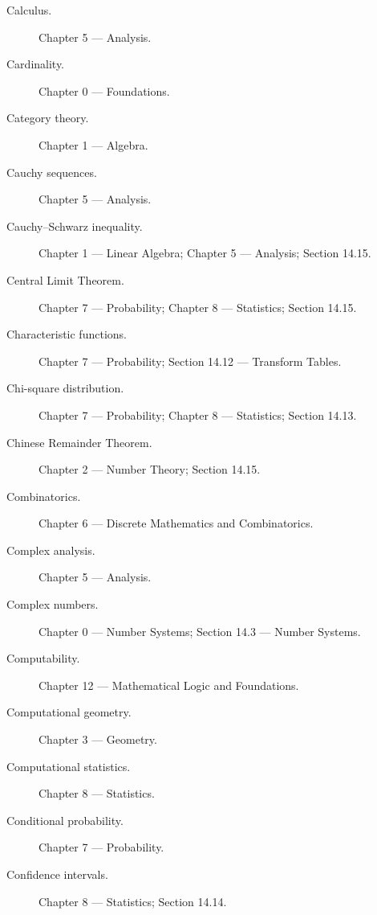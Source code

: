 \begin{description}

\item[Calculus.]
Chapter 5 --- Analysis.

\item[Cardinality.]
Chapter 0 --- Foundations.

\item[Category theory.]
Chapter 1 --- Algebra.

\item[Cauchy sequences.]
Chapter 5 --- Analysis.

\item[Cauchy--Schwarz inequality.]
Chapter 1 --- Linear Algebra;
Chapter 5 --- Analysis;
Section 14.15.

\item[Central Limit Theorem.]
Chapter 7 --- Probability;
Chapter 8 --- Statistics;
Section 14.15.

\item[Characteristic functions.]
Chapter 7 --- Probability;
Section 14.12 --- Transform Tables.

\item[Chi-square distribution.]
Chapter 7 --- Probability;
Chapter 8 --- Statistics;
Section 14.13.

\item[Chinese Remainder Theorem.]
Chapter 2 --- Number Theory;
Section 14.15.

\item[Combinatorics.]
Chapter 6 --- Discrete Mathematics and Combinatorics.

\item[Complex analysis.]
Chapter 5 --- Analysis.

\item[Complex numbers.]
Chapter 0 --- Number Systems;
Section 14.3 --- Number Systems.

\item[Computability.]
Chapter 12 --- Mathematical Logic and Foundations.

\item[Computational geometry.]
Chapter 3 --- Geometry.

\item[Computational statistics.]
Chapter 8 --- Statistics.

\item[Conditional probability.]
Chapter 7 --- Probability.

\item[Confidence intervals.]
Chapter 8 --- Statistics;
Section 14.14.


\end{description}
